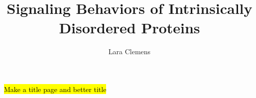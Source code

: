 \documentclass[onecolumn]{article}
\begin{document}
\title{Signaling Behaviors of Intrinsically Disordered Proteins}
\author{Lara Clemens}
\date{}

\maketitle

\hl{Make a title page and better title}




%





\graphicspath{{ModelDevelopment/}}



\graphicspath{{Results/GeneralStiffElectro/}}



\graphicspath{{Results/SimultaneousBinding/}}



\graphicspath{{Results/SurfaceEffects/}}



\graphicspath{{Timeline/}}



\graphicspath{{Appendix/}}



\printbibliography



\end{document}

